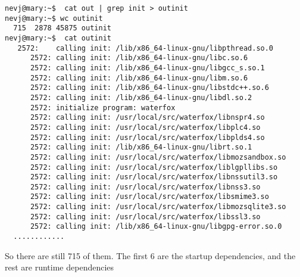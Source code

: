\documentclass[a4paper]{article}  %
\begin{document}
\begin{tcolorbox}
\begin{verbatim}
nevj@mary:~$  cat out | grep init > outinit
nevj@mary:~$ wc outinit
  715  2878 45875 outinit
nevj@mary:~$  cat outinit
   2572:	calling init: /lib/x86_64-linux-gnu/libpthread.so.0
      2572:	calling init: /lib/x86_64-linux-gnu/libc.so.6
      2572:	calling init: /lib/x86_64-linux-gnu/libgcc_s.so.1
      2572:	calling init: /lib/x86_64-linux-gnu/libm.so.6
      2572:	calling init: /lib/x86_64-linux-gnu/libstdc++.so.6
      2572:	calling init: /lib/x86_64-linux-gnu/libdl.so.2
      2572:	initialize program: waterfox
      2572:	calling init: /usr/local/src/waterfox/libnspr4.so
      2572:	calling init: /usr/local/src/waterfox/libplc4.so
      2572:	calling init: /usr/local/src/waterfox/libplds4.so
      2572:	calling init: /lib/x86_64-linux-gnu/librt.so.1
      2572:	calling init: /usr/local/src/waterfox/libmozsandbox.so
      2572:	calling init: /usr/local/src/waterfox/liblgpllibs.so
      2572:	calling init: /usr/local/src/waterfox/libnssutil3.so
      2572:	calling init: /usr/local/src/waterfox/libnss3.so
      2572:	calling init: /usr/local/src/waterfox/libsmime3.so
      2572:	calling init: /usr/local/src/waterfox/libmozsqlite3.so
      2572:	calling init: /usr/local/src/waterfox/libssl3.so
      2572:	calling init: /lib/x86_64-linux-gnu/libgpg-error.so.0
  ............
\end{verbatim}
\end{tcolorbox}
  
So there are still 715 of them. The first 6 are the startup dependencies, and the rest are runtime dependencies
\end{document}

